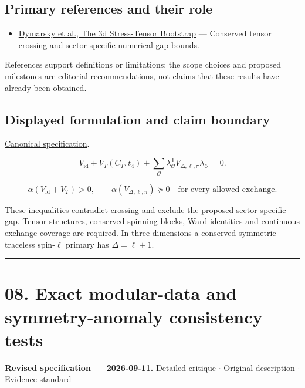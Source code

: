 \documentclass[
  11pt,
]{article}
\providecommand{\tightlist}{%
  \setlength{\itemsep}{0pt}\setlength{\parskip}{0pt}}
\begin{document}
\subsection{Primary references and their role}

\begin{itemize}
\tightlist
\item
  \href{https://arxiv.org/abs/1708.05718}{Dymarsky et al., The 3d
  Stress-Tensor Bootstrap} --- Conserved tensor crossing and
  sector-specific numerical gap bounds.
\end{itemize}

References support definitions or limitations; the scope choices and
proposed milestones are editorial recommendations, not claims that these
results have already been obtained.

\subsection{Displayed formulation and claim boundary}

\href{https://github.com/rick-stevens-ai/Pure-Thought/blob/main/PRDs/07-Extremal-CFTs-Stress-Tensor.md}{Canonical
specification}.

\[V_{\mathrm{id}}+V_T(C_T,t_4)+
\sum_{\mathcal O}\lambda_{\mathcal O}^{\mathsf T}V_{\Delta,\ell,\pi}
\lambda_{\mathcal O}=0.\]

\[\alpha(V_{\mathrm{id}}+V_T)>0,\qquad
\alpha(V_{\Delta,\ell,\pi})\succeq0
\quad\text{for every allowed exchange}.\]

These inequalities contradict crossing and exclude the proposed
sector-specific gap. Tensor structures, conserved spinning blocks, Ward
identities and continuous exchange coverage are required. In three
dimensions a conserved symmetric-traceless spin-\(\ell\) primary has
\(\Delta=\ell+1\).

\begin{center}\rule{0.5\linewidth}{0.5pt}\end{center}

\section{08. Exact modular-data and symmetry-anomaly consistency tests}

\textbf{Revised specification --- 2026-09-11.}
\href{https://github.com/rick-stevens-ai/Pure-Thought/blob/main/reviews/08-Swampland-Modularity-Symmetries.md}{Detailed
critique} \ensuremath{\cdot}
\href{https://github.com/rick-stevens-ai/Pure-Thought/blob/main/archive/original-PRDs/08-Swampland-Modularity-Symmetries.md}{Original
description} \ensuremath{\cdot}
\href{https://github.com/rick-stevens-ai/Pure-Thought/blob/main/reviews/EVIDENCE-STANDARD.md}{Evidence
standard}
\end{document}
